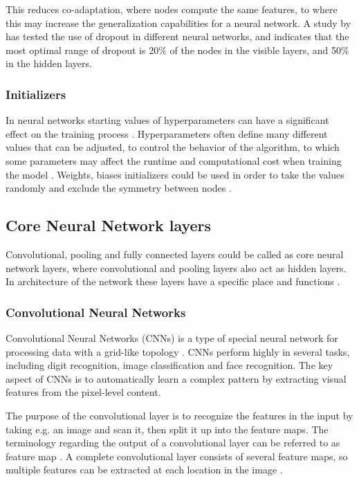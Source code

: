 \noindent
This reduces co-adaptation, where nodes compute the same features, to where this may increase the generalization capabilities for a neural network. 
A study by \citeauthor{Srivastava2014} \citep{Srivastava2014} has tested the use of dropout in different neural networks, and indicates that the most optimal range of dropout is 20\% of the nodes in the visible layers, and 50\% in the hidden layers.\citep{Srivastava2014}

\subsubsection{Initializers}
In neural networks starting values of hyperparameters can have a significant effect on the training process \citep{Bengio2012}. Hyperparameters often define many different values that can be adjusted, to control the behavior of the algorithm, to which some parameters may affect the runtime and computational cost when training the model \citep{Goodfellow2016}. Weights, biases initializers could be used in order to take the values randomly and exclude the symmetry between nodes \citep{Gustafson1998}. 

\subsection{Core Neural Network layers}\label{sec:Layers}
Convolutional, pooling and fully connected layers could be called as core neural network layers, where convolutional and pooling layers also act as hidden layers. In architecture of the network these layers have a specific place and functions \citep{LeCun2,Goodfellow2016}.

\subsubsection{Convolutional Neural Networks}
Convolutional Neural Networks (CNNs) is a type of special neural network for processing data with a grid-like topology \citep{Goodfellow2016}. CNNs perform highly in several tasks, including digit recognition, image classification and face recognition. The key aspect of CNNs is to automatically learn a complex pattern by extracting visual features from the pixel-level content.\citep{Acquarelli2017,LeCun1998}

\noindent
The purpose of the convolutional layer is to recognize the features in the input by taking e.g. an image and scan it, then split it up into the feature maps. The terminology regarding the output of a convolutional layer can be referred to as feature map \citep{Goodfellow2016,LeCun1998}. A complete convolutional layer consists of several feature maps, so multiple features can be extracted at each location in the image \citep{LeCun1998}. 


